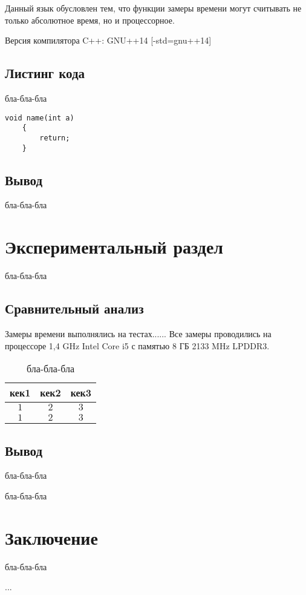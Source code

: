 \documentclass[12pt, a4paper]{report}
\begin{document}
	\vspace{0.2cm}Данный язык обусловлен тем, что функции замеры времени могут считывать не только абсолютное время, но и процессорное.
	
	\vspace{0.2cm}Версия компилятора C++: GNU++14 [-std=gnu++14]
	
	
	
	\section{Листинг кода}
	бла-бла-бла

	\begin{lstlisting}[label=code-opt,caption=бла-бла-бла]
	void name(int a)
	{
		return;
	}
	\end{lstlisting}

	\newpage

	\section{Вывод}
	бла-бла-бла

			
	\chapter{Экспериментальный раздел}
	
	\vspace{-0.5cm}бла-бла-бла
	
	\section{Сравнительный анализ}
	Замеры времени выполнялись на тестах...... Все замеры проводились на процессоре 1,4 GHz Intel Core i5 с памятью 8 ГБ 2133 MHz LPDDR3.
	
	\begin{table}[ht!]
		\caption{бла-бла-бла}
		\label{unit-tests}
		\begin{center}
			\begin{tabular}{|c|c|c|}
				\hline
				\bf{кек1} & \bf{кек2} & \bf{кек3}\\\hline
				
				$1$ & $2$ & $3$\\\hline
				
				$1$ & $2$ & $3$\\\hline
			\end{tabular}
		\end{center}
	\end{table}
	
	
	\section{Вывод}
	бла-бла-бла

	\newpage
	
 	бла-бла-бла

	\chapter*{Заключение}
	бла-бла-бла
	
	\newpage
	
	\begin{thebibliography}{}
	\bibitem ...
	\end{thebibliography}
\end{document}
